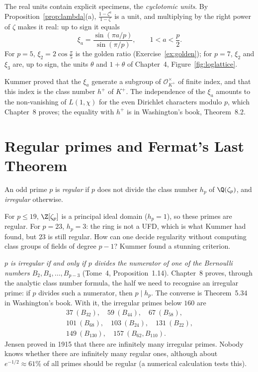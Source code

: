 The real units contain explicit specimens, the \emph{cyclotomic units}. By Proposition~\ref{prop:lambda}(a),
$\frac{1-\zeta^a}{1-\zeta}$ is a unit, and multiplying by the right power of $\zeta$ makes it real: up to sign it equals
\[
\xi_a=\frac{\sin(\pi a/p)}{\sin(\pi/p)},\qquad 1<a<\frac p2.
\]
For $p=5$, $\xi_2=2\cos\frac\pi5$ is the golden ratio (Exercise~\ref{ex:golden}); for $p=7$, $\xi_2$ and $\xi_3$ are, up to sign,
the units $\theta$ and $1+\theta$ of Chapter~4, Figure~\ref{fig:loglattice}.

\begin{remark}
Kummer proved that the $\xi_a$ generate a subgroup of $\mathcal O_{K^+}^\times$ of finite index, and that this index is the
class number $h^+$ of $K^+$. The independence of the $\xi_a$ amounts to the non-vanishing of $L(1,\chi)$ for the even
Dirichlet characters modulo $p$, which Chapter~8 proves; the equality with $h^+$ is in Washington's book, Theorem~8.2.
\end{remark}

\section{Regular primes and Fermat's Last Theorem}

\begin{definition}
An odd prime $p$ is \emph{regular} if $p$ does not divide the class number $h_p$ of $\Q(\zeta_p)$, and \emph{irregular}
otherwise.
\end{definition}

For $p\le19$, $\Z[\zeta_p]$ is a principal ideal domain ($h_p=1$), so these primes are regular. For $p=23$, $h_p=3$: the ring
is not a UFD, which is what Kummer had found, but $23$ is still regular. How can one decide regularity without computing
class groups of fields of degree $p-1$? Kummer found a stunning criterion.

\begin{remark}
\emph{$p$ is irregular if and only if $p$ divides the numerator of one of the Bernoulli numbers $B_2,B_4,\dots,B_{p-3}$}
(Tome~4, Proposition~1.14). Chapter~8 proves, through the analytic class number formula, the half we need to recognise an
irregular prime: if $p$ divides such a numerator, then $p\mid h_p$. The converse is Theorem~5.34 in Washington's book. With it,
the irregular primes below $160$ are
\begin{gather*}
37\ (B_{32}),\quad 59\ (B_{44}),\quad 67\ (B_{58}),\\ 101\ (B_{68}),\quad 103\ (B_{24}),\quad 131\ (B_{22}),\\
149\ (B_{130}),\quad 157\ (B_{62},B_{110}).
\end{gather*}
Jensen proved in 1915 that there are infinitely many irregular primes. Nobody knows whether there are infinitely many regular
ones, although about $e^{-1/2}\approx61\%$ of all primes should be regular (a numerical calculation tests this).
\end{remark}

